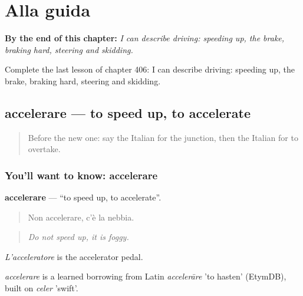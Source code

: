 
\chapter{Alla guida}
\label{ch:it-alla-guida}

\begin{chapteropening}
\textbf{By the end of this chapter:} \emph{I can describe driving: speeding up, the brake, braking hard, steering and skidding.}

Complete the last lesson of chapter 406: I can describe driving: speeding up, the brake, braking hard, steering and skidding.
\end{chapteropening}

\section[accelerare]{accelerare — to speed up, to accelerate}

\label{lesson:IT-C406-accelerare}



\begin{quote}
Before the new one: say the Italian for the junction, then the Italian for to overtake.
\end{quote}

\subsection*{You'll want to know: accelerare}
\textbf{accelerare} — \textquotedblleft{}to speed up, to accelerate\textquotedblright{}.

\begin{quote}
Non accelerare, c'è la nebbia.
\end{quote}

\begin{quote}
\emph{Do not speed up, it is foggy.}
\end{quote}

\emph{L'acceleratore} is the accelerator pedal.

\begin{cousinweb}
\emph{accelerare} is a learned borrowing from Latin \emph{accelerāre} 'to hasten' (EtymDB), built on \emph{celer} 'swift'.
\end{cousinweb}

